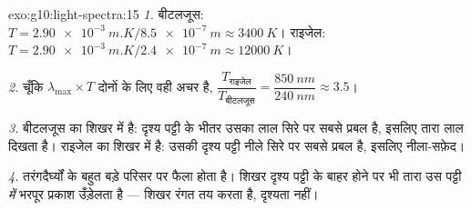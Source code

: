 \begin{solution}{exo:g10:light-spectra:15}
\emph{1.} बीटलजूस: $T = \qty{2.90e-3}{m.K} / \qty{8.5e-7}{m} \approx \qty{3400}{K}$। राइजेल: $T = \qty{2.90e-3}{m.K} / \qty{2.4e-7}{m} \approx \qty{12000}{K}$।

\emph{2.} चूँकि $\lambda_{\max} \times T$ दोनों के लिए वही अचर है, $\dfrac{T_{\text{राइजेल}}}{T_{\text{बीटलजूस}}}
= \dfrac{\qty{850}{nm}}{\qty{240}{nm}} \approx 3.5$।

\emph{3.} बीटलजूस का शिखर  में है: दृश्य पट्टी के भीतर
उसका  लाल सिरे पर सबसे प्रबल है, इसलिए तारा लाल दिखता
है। राइजेल का शिखर  में है: उसकी दृश्य पट्टी नीले
सिरे पर सबसे प्रबल है, इसलिए नीला-सफ़ेद।

\emph{4.}  तरंगदैर्घ्यों के बहुत बड़े
परिसर पर फैला होता है। शिखर दृश्य पट्टी के बाहर होने पर भी तारा उस
पट्टी \emph{में} भरपूर प्रकाश उँड़ेलता है --- शिखर रंगत तय करता है,
दृश्यता नहीं।
\end{solution}

